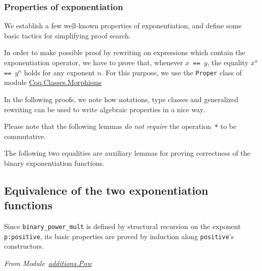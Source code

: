 \subsubsection{Properties of exponentiation}
We establish a few well-known properties of exponentiation, and define some basic tactics for simplifying proof search.


In order to make possible proof by rewriting on expressions which contain
the exponentiation operator, we have to prove that, whenever \texttt{$x$ == $y$},
the equality \texttt{$x^n$ == $y^n$} holds for any exponent \texttt{$n$}. 
For this purpose, we use the \texttt{Proper} class of module
\href{https://coq.inria.fr/distrib/current/stdlib/Coq.Classes.Morphisms.html}{Coq.Classes.Morphisms}


In the following proofs, we note how notations, type classes and generalized 
rewriting can be used  to write algebraic properties in a nice way.




  Please note that the following lemmas \emph{do not require} 
the operation~\texttt{*} to be commutative.


The following two equalities are auxiliary lemmas for proving correctness of the binary exponentiation functions.



\subsection{Equivalence of the two exponentiation functions}

Since \texttt{binary\_power\_mult} is defined by structural recursion on the
exponent \texttt{p:positive}, its basic properties are proved by induction
along \texttt{positive}'s constructors.

\vspace{4pt}
\emph{From Module~\href{../theories/html/additions.Pow.html}{additions.Pow}}



